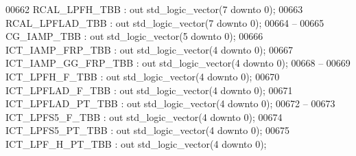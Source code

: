 \begin{DoxyCode}
00662         RCAL\_LPFH\_TBB       : \textcolor{keywordflow}{out} \textcolor{comment}{std\_logic\_vector}(\textcolor{vhdllogic}{}\textcolor{vhdllogic}{7} \textcolor{keywordflow}{downto} \textcolor{vhdllogic}{}\textcolor{vhdllogic}{0});
00663         RCAL\_LPFLAD\_TBB : \textcolor{keywordflow}{out} \textcolor{comment}{std\_logic\_vector}(\textcolor{vhdllogic}{}\textcolor{vhdllogic}{7} \textcolor{keywordflow}{downto} \textcolor{vhdllogic}{}\textcolor{vhdllogic}{0});
00664 \textcolor{keyword}{        --}
00665         CG\_IAMP\_TBB                 : \textcolor{keywordflow}{out} \textcolor{comment}{std\_logic\_vector}(\textcolor{vhdllogic}{}\textcolor{vhdllogic}{5} \textcolor{keywordflow}{downto} \textcolor{vhdllogic}{}\textcolor{vhdllogic}{0});
00666         ICT\_IAMP\_FRP\_TBB    : \textcolor{keywordflow}{out} \textcolor{comment}{std\_logic\_vector}(\textcolor{vhdllogic}{}\textcolor{vhdllogic}{4} \textcolor{keywordflow}{downto} \textcolor{vhdllogic}{}\textcolor{vhdllogic}{0});
00667         ICT\_IAMP\_GG\_FRP\_TBB : \textcolor{keywordflow}{out} \textcolor{comment}{std\_logic\_vector}(\textcolor{vhdllogic}{}\textcolor{vhdllogic}{4} \textcolor{keywordflow}{downto} \textcolor{vhdllogic}{}\textcolor{vhdllogic}{0});
00668 \textcolor{keyword}{        --}
00669         ICT\_LPFH\_F\_TBB      : \textcolor{keywordflow}{out} \textcolor{comment}{std\_logic\_vector}(\textcolor{vhdllogic}{}\textcolor{vhdllogic}{4} \textcolor{keywordflow}{downto} \textcolor{vhdllogic}{}\textcolor{vhdllogic}{0});
00670         ICT\_LPFLAD\_F\_TBB  : \textcolor{keywordflow}{out} \textcolor{comment}{std\_logic\_vector}(\textcolor{vhdllogic}{}\textcolor{vhdllogic}{4} \textcolor{keywordflow}{downto} \textcolor{vhdllogic}{}\textcolor{vhdllogic}{0});
00671         ICT\_LPFLAD\_PT\_TBB : \textcolor{keywordflow}{out} \textcolor{comment}{std\_logic\_vector}(\textcolor{vhdllogic}{}\textcolor{vhdllogic}{4} \textcolor{keywordflow}{downto} \textcolor{vhdllogic}{}\textcolor{vhdllogic}{0});
00672 \textcolor{keyword}{        --}
00673         ICT\_LPFS5\_F\_TBB     : \textcolor{keywordflow}{out} \textcolor{comment}{std\_logic\_vector}(\textcolor{vhdllogic}{}\textcolor{vhdllogic}{4} \textcolor{keywordflow}{downto} \textcolor{vhdllogic}{}\textcolor{vhdllogic}{0});
00674         ICT\_LPFS5\_PT\_TBB    : \textcolor{keywordflow}{out} \textcolor{comment}{std\_logic\_vector}(\textcolor{vhdllogic}{}\textcolor{vhdllogic}{4} \textcolor{keywordflow}{downto} \textcolor{vhdllogic}{}\textcolor{vhdllogic}{0});
00675         ICT\_LPF\_H\_PT\_TBB    : \textcolor{keywordflow}{out} \textcolor{comment}{std\_logic\_vector}(\textcolor{vhdllogic}{}\textcolor{vhdllogic}{4} \textcolor{keywordflow}{downto} \textcolor{vhdllogic}{}\textcolor{vhdllogic}{0});

\end{DoxyCode}
